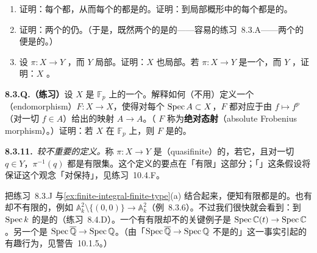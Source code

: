\begin{exercise}[不难但重要的数道练习]\label{ex:finite-type-basic-properties}
\begin{enumerate}[label=(\alph*)]
\item 证明：每个\trOpenEmbedding{}都\trLocally\trFiniteType，从而每个\trQuasicompact{}的\trOpenEmbedding{}都是\trFiniteType{}的。证明：到局部\trNoetherian{}概形中的每个\trOpenEmbedding{}都是\trFiniteType{}的。
\item 证明：两个\trLocally\trFiniteType{}\trMorphism{}的\trComposition{}仍\trLocally\trFiniteType。（于是，既然两个\trQuasicompact{}\trMorphism{}的\trComposition{}是\trQuasicompact{}的——容易的练习~8.3.A——两个\trFiniteType{}\trMorphism{}的\trComposition{}便是\trFiniteType{}的。）
\item 设 $\pi\colon X\to Y$ \trLocally\trFiniteType，而 $Y$ 局部\trNoetherian。证明：$X$ 也局部\trNoetherian。若 $\pi\colon X\to Y$ 是一个\trFiniteType{}\trMorphism{}，而 $Y$ \trNoetherian，证明：$X$ \trNoetherian。
\end{enumerate}
\end{exercise}

\textbf{8.3.Q.（练习）}\quad 设 $X$ 是 $\mathbb{F}_p$ 上的一个\trScheme。解释如何（不用\trAxiomOfChoice）定义一个\trEndomorphism{}（endomorphism）$F\colon X\to X$，使得对每个\trAffine\trOpenSubset{} $\operatorname{Spec} A\subset X$，$F$ 都对应于由 $f\mapsto f^p$（对一切 $f\in A$）给出的映射 $A\to A$。（\trMorphism{} $F$ 称为\textbf{绝对\trFrobenius{}态射}（absolute Frobenius morphism）。）证明：若 $X$ 在 $\mathbb{F}_p$ 上\trLocally\trFiniteType，则 $F$ 是\trFinite{}的。

\textbf{8.3.11.}\ \emph{较不重要的定义。}\quad 称\trMorphism{} $\pi\colon X\to Y$ 是\textbf{\trQuasifinite{}}（quasifinite）的，若它\trFiniteType，且对一切 $q\in Y$，$\pi^{-1}(q)$ 都是有限集。这个定义的要点在「\trFiber{}有限」这部分；「\trFiniteType」这条假设将保证这个观念「对\trFiberProduct{}保持」，见\mbox{练习~10.4.F}。

把练习~8.3.J 与\cref{ex:finite-integral-finite-type}(a) 结合起来，便知有限\trMorphism{}都是\trQuasifinite{}的。也有\trQuasifinite{}却不有限的\trMorphism{}，例如 $\mathbb{A}^2_k\setminus\{(0,0)\}\to\mathbb{A}^2_k$（例~8.3.6）。不过我们很快就会看到：到 $\operatorname{Spec} k$ 的\trQuasifinite{}\trMorphism{}是\trFinite{}的（\mbox{练习~8.4.D}）。一个有有限\trFiber{}却不\trQuasifinite{}的关键例子是 $\operatorname{Spec}\mathbb{C}(t)\to\operatorname{Spec}\mathbb{C}$。另一个是 $\operatorname{Spec}\overline{\mathbb{Q}}\to\operatorname{Spec}\mathbb{Q}$。（由「$\operatorname{Spec}\overline{\mathbb{Q}}\to\operatorname{Spec}\mathbb{Q}$ 不是\trFiniteType{}的」这一事实引起的有趣行为，见警告~10.1.5。）


